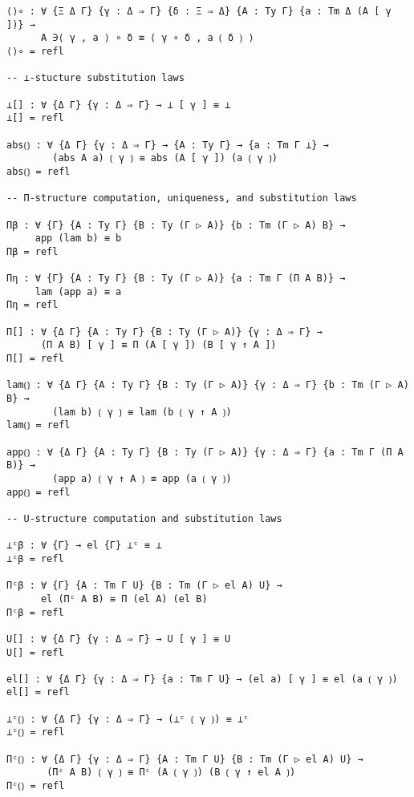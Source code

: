 \documentclass{article}
\renewcommand{\_}{\textrm{\textscale{.5}{\textunderscore}}}
\theoremstyle{definition}
\theoremstyle{plain}
\begin{document}
\begin{verbatim}
⟨⟩∘ : ∀ {Ξ Δ Γ} {γ : Δ ⇒ Γ} {δ : Ξ ⇒ Δ} {A : Ty Γ} {a : Tm Δ (A [ γ ])} →
      A ∋⟨ γ , a ⟩ ∘ δ ≡ ⟨ γ ∘ δ , a ⟮ δ ⟯ ⟩
⟨⟩∘ = refl

-- ⊥-stucture substitution laws

⊥[] : ∀ {Δ Γ} {γ : Δ ⇒ Γ} → ⊥ [ γ ] ≡ ⊥
⊥[] = refl

abs⟮⟯ : ∀ {Δ Γ} {γ : Δ ⇒ Γ} → {A : Ty Γ} → {a : Tm Γ ⊥} →
        (abs A a) ⟮ γ ⟯ ≡ abs (A [ γ ]) (a ⟮ γ ⟯)
abs⟮⟯ = refl

-- Π-structure computation, uniqueness, and substitution laws

Πβ : ∀ {Γ} {A : Ty Γ} {B : Ty (Γ ▷ A)} {b : Tm (Γ ▷ A) B} →
     app (lam b) ≡ b
Πβ = refl

Πη : ∀ {Γ} {A : Ty Γ} {B : Ty (Γ ▷ A)} {a : Tm Γ (Π A B)} →
     lam (app a) ≡ a
Πη = refl

Π[] : ∀ {Δ Γ} {A : Ty Γ} {B : Ty (Γ ▷ A)} {γ : Δ ⇒ Γ} →
      (Π A B) [ γ ] ≡ Π (A [ γ ]) (B [ γ ↑ A ])
Π[] = refl

lam⟮⟯ : ∀ {Δ Γ} {A : Ty Γ} {B : Ty (Γ ▷ A)} {γ : Δ ⇒ Γ} {b : Tm (Γ ▷ A) B} →
        (lam b) ⟮ γ ⟯ ≡ lam (b ⟮ γ ↑ A ⟯)
lam⟮⟯ = refl

app⟮⟯ : ∀ {Δ Γ} {A : Ty Γ} {B : Ty (Γ ▷ A)} {γ : Δ ⇒ Γ} {a : Tm Γ (Π A B)} →
        (app a) ⟮ γ ↑ A ⟯ ≡ app (a ⟮ γ ⟯)
app⟮⟯ = refl

-- U-structure computation and substitution laws

⊥ᶜβ : ∀ {Γ} → el {Γ} ⊥ᶜ ≡ ⊥
⊥ᶜβ = refl

Πᶜβ : ∀ {Γ} {A : Tm Γ U} {B : Tm (Γ ▷ el A) U} →
      el (Πᶜ A B) ≡ Π (el A) (el B)
Πᶜβ = refl

U[] : ∀ {Δ Γ} {γ : Δ ⇒ Γ} → U [ γ ] ≡ U
U[] = refl

el[] : ∀ {Δ Γ} {γ : Δ ⇒ Γ} {a : Tm Γ U} → (el a) [ γ ] ≡ el (a ⟮ γ ⟯)
el[] = refl

⊥ᶜ⟮⟯ : ∀ {Δ Γ} {γ : Δ ⇒ Γ} → (⊥ᶜ ⟮ γ ⟯) ≡ ⊥ᶜ
⊥ᶜ⟮⟯ = refl

Πᶜ⟮⟯ : ∀ {Δ Γ} {γ : Δ ⇒ Γ} {A : Tm Γ U} {B : Tm (Γ ▷ el A) U} →
       (Πᶜ A B) ⟮ γ ⟯ ≡ Πᶜ (A ⟮ γ ⟯) (B ⟮ γ ↑ el A ⟯)
Πᶜ⟮⟯ = refl
\end{verbatim}
\end{document}
